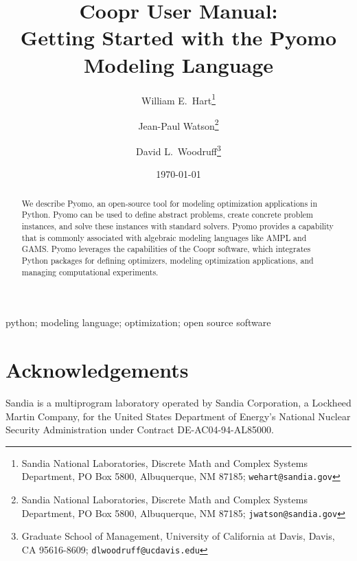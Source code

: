 \documentclass[12pt]{book}
\begin{document}
\title{Coopr User Manual:\\Getting Started with the Pyomo Modeling Language}

\author{William E.\ Hart\footnote{Sandia National Laboratories, Discrete Math and Complex Systems Department, PO Box 5800, Albuquerque, NM 87185; {\tt wehart@sandia.gov}}
\and
Jean-Paul Watson\footnote{Sandia National Laboratories, Discrete Math and Complex Systems Department, PO Box 5800, Albuquerque, NM 87185; {\tt jwatson@sandia.gov}}
\and
David L.\ Woodruff\footnote{Graduate School of Management, University of California at Davis,
Davis, CA 95616-8609; {\tt dlwoodruff@ucdavis.edu}}
}

\date{\today}

\maketitle

\begin{abstract}
We describe Pyomo, an open-source tool for modeling optimization applications in Python. Pyomo can be used to define abstract problems, create concrete problem instances, and solve these instances with standard solvers. Pyomo provides a capability that is commonly associated with algebraic modeling languages like AMPL and GAMS.  Pyomo leverages the capabilities of the Coopr software, which integrates Python packages for defining optimizers, modeling optimization applications, and managing computational experiments.
\end{abstract}

 python; modeling language; optimization; open source software
\fi

\tableofcontents










\section*{Acknowledgements}

Sandia is a multiprogram laboratory
operated by Sandia Corporation, a Lockheed Martin Company, for the United
States Department of Energy's National Nuclear Security Administration
under Contract DE-AC04-94-AL85000.




\end{document}
